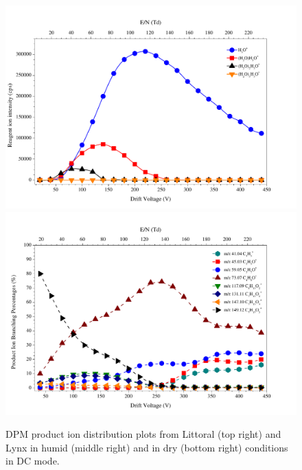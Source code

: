 \begin{figure}
\includegraphics[width=0.48\linewidth]{pics/DPM_clusters_lynx_dry.pdf}
\includegraphics[width=0.48\linewidth]{pics/DPM_dry_DC_lynx.pdf}
\caption{DPM product ion distribution plots from  Littoral (top right) and Lynx in humid (middle right) and in dry (bottom right) conditions in DC mode.}
\label{dpm}
\end{figure}


